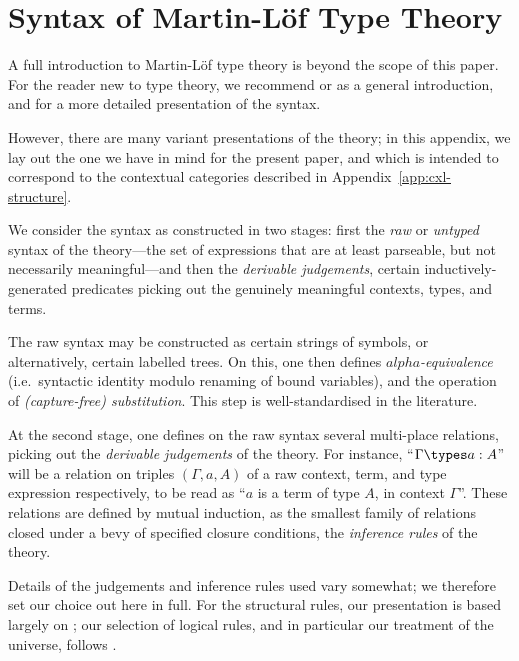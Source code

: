 
\section{Syntax of Martin-L\"of Type Theory} \label{app:type-theory}

A full introduction to Martin-Löf type theory is beyond the scope of this paper.
%
For the reader new to type theory, we recommend \cite{martin-lof:bibliopolis} or \cite{n-p-s:programming} as a general introduction, and \cite{hofmann:syntax-and-semantics} for a more detailed presentation of the syntax.

However, there are many variant presentations of the theory; in this appendix, we lay out the one we have in mind for the present paper, and which is intended to correspond to the contextual categories described in Appendix~\ref{app:cxl-structure}.

We consider the syntax as constructed in two stages: first the \emph{raw} or \emph{untyped} syntax of the theory---the set of expressions that are at least parseable, but not necessarily meaningful---and then the \emph{derivable judgements}, certain inductively-generated predicates picking out the genuinely meaningful contexts, types, and terms.

The raw syntax may be constructed as certain strings of symbols, or alternatively, certain labelled trees. On this, one then defines \emph{$alpha$-equivalence} (i.e.\ syntactic identity modulo renaming of bound variables), and the operation of \emph{(capture-free) substitution}.  This step is well-standardised in the literature.

At the second stage, one defines on the raw syntax several multi-place relations, picking out the \emph{derivable judgements} of the theory.  For instance, “$\Gamma \types a : A$” will be a relation on triples $(\Gamma, a, A)$ of a raw context, term, and type expression respectively, to be read as “$a$ is a term of type $A$, in context $\Gamma$”.  These relations are defined by mutual induction, as the smallest family of relations closed under a bevy of specified closure conditions, the \emph{inference rules} of the theory.

Details of the judgements and inference rules used vary somewhat; we therefore set our choice out here in full.  For the structural rules, our presentation is based largely on \cite{hofmann:syntax-and-semantics}; our selection of logical rules, and in particular our treatment of the universe, follows \cite{martin-lof:bibliopolis}.

